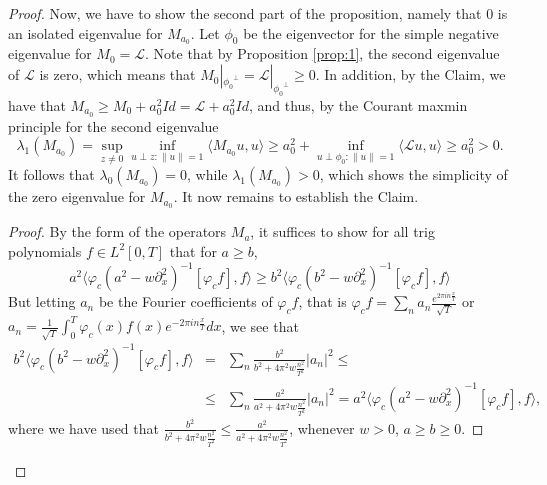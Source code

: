 \documentclass[final,11pt,leqno]{amsart}
\begin{document}
\begin{proof}
Now, we have to show the second part of the proposition, namely that $0$ is an isolated eigenvalue for $M_{a_0}$. Let $\phi_0$ be the
eigenvector for the simple negative eigenvalue for $M_0={\mathcal L}$. Note that by  Proposition \ref{prop:1}, the second eigenvalue of ${\mathcal L}$ is zero,
which means that $M_0|_{{\phi_0}^\perp}={\mathcal L}|_{{\phi_0}^\perp}\geq 0$.
 In addition, by the Claim, we have that $M_{a_0}\geq M_0+a_0^2 Id={\mathcal L}+a_0^2 Id$, and thus, by the Courant maxmin principle for the second eigenvalue
 $$
 {\lambda}_1(M_{a_0})=\sup_{z\neq 0} \inf_{u\perp z: \|u\|=1} {\langle {M_{a_0} u},{u} \rangle}\geq
 a_0^2 + \inf_{u\perp \phi_0: \|u\|=1} {\langle {{\mathcal L} u},{u} \rangle}\geq a_0^2>0.
 $$
 It follows that ${\lambda}_0(M_{a_0})=0$, while ${\lambda}_1(M_{a_0})>0$, which shows the simplicity of the zero eigenvalue for $M_{a_0}$. It now remains to establish the Claim.
 \begin{proof}
 By the form of the operators $M_a$, it suffices to show for all trig polynomials  $f\in L^2[0,T]$ that for $a\geq b$,
 $$
 a^2{\langle {{\varphi}_c (a^2-w {\partial}_x^2)^{-1} [{\varphi}_c f]},{f} \rangle}\geq b^2{\langle {{\varphi}_c (b^2-w {\partial}_x^2)^{-1} [{\varphi}_c f]},{f} \rangle}
 $$
 But letting $a_n$ be the Fourier coefficients of ${\varphi}_cf$, that is
 ${\varphi}_c f=\sum_n a_n {\frac{{e^{2\pi i n {\frac{{x}}{{T}}}}}}{{\sqrt{T}}}}$  or \\
 $a_n={\frac{{1}}{{\sqrt{T}}}} \int_0^T {\varphi}_c(x) f(x)  e^{-2\pi i n {\frac{{x}}{{T}}}} dx$,
 we see that
 \begin{eqnarray*}
  b^2{\langle {{\varphi}_c (b^2-w {\partial}_x^2)^{-1} [{\varphi}_c f]},{f} \rangle} &=&
 \sum_n {\frac{{b^2  }}{{b^2+4\pi^2 w {\frac{{n^2}}{{T^2}}}}}}|a_n|^2\leq \\
 & \leq &   \sum_n {\frac{{a^2  }}{{a^2+4\pi^2 w {\frac{{n^2}}{{T^2}}}}}}|a_n|^2= a^2{\langle {{\varphi}_c (a^2-w {\partial}_x^2)^{-1} [{\varphi}_c f]},{f} \rangle},
 \end{eqnarray*}
where we have used that  ${\frac{{b^2  }}{{b^2+4\pi^2 w {\frac{{n^2}}{{T^2}}}}}}\leq {\frac{{a^2  }}{{a^2+4\pi^2 w {\frac{{n^2}}{{T^2}}}}}}$, whenever $w>0$, $a\geq b\geq 0$.
 \end{proof}

 \end{proof}
\end{document}
